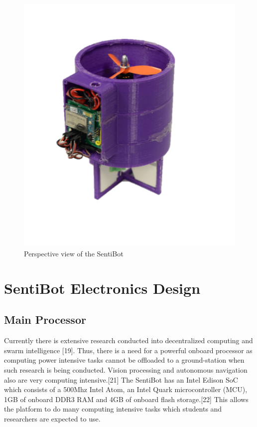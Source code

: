 \documentclass[12pt]{article}
\begin{document}
\begin{figure}
	\includegraphics[width=\linewidth]{sb-side.png}
	\caption{Perspective view of the SentiBot}
	\label{fig:sb-side}
\end{figure}

\section{SentiBot Electronics Design}

\subsection{Main Processor}

Currently there is extensive research conducted into decentralized computing and swarm intelligence [19].  Thus, there is a need for a powerful onboard processor as computing power intensive tasks cannot be offloaded to a ground-station when such research is being conducted. Vision processing and autonomous navigation also are very computing intensive.[21] The SentiBot has an Intel Edison SoC which consists of a 500Mhz Intel Atom, an Intel Quark microcontroller (MCU), 1GB of onboard DDR3 RAM and 4GB of onboard flash storage.[22] This allows the platform to do many computing intensive tasks which students and researchers are expected to use.
\end{document}
